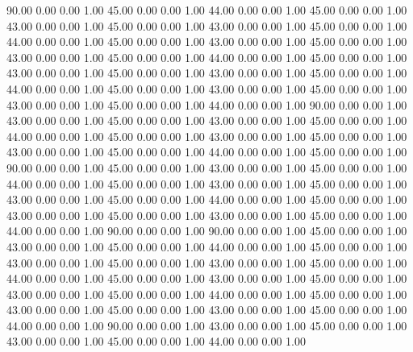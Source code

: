    90.00   0.00   0.00   1.00
   45.00   0.00   0.00   1.00
   44.00   0.00   0.00   1.00
   45.00   0.00   0.00   1.00
   43.00   0.00   0.00   1.00
   45.00   0.00   0.00   1.00
   43.00   0.00   0.00   1.00
   45.00   0.00   0.00   1.00
   44.00   0.00   0.00   1.00
   45.00   0.00   0.00   1.00
   43.00   0.00   0.00   1.00
   45.00   0.00   0.00   1.00
   43.00   0.00   0.00   1.00
   45.00   0.00   0.00   1.00
   44.00   0.00   0.00   1.00
   45.00   0.00   0.00   1.00
   43.00   0.00   0.00   1.00
   45.00   0.00   0.00   1.00
   43.00   0.00   0.00   1.00
   45.00   0.00   0.00   1.00
   44.00   0.00   0.00   1.00
   45.00   0.00   0.00   1.00
   43.00   0.00   0.00   1.00
   45.00   0.00   0.00   1.00
   43.00   0.00   0.00   1.00
   45.00   0.00   0.00   1.00
   44.00   0.00   0.00   1.00
   90.00   0.00   0.00   1.00
   43.00   0.00   0.00   1.00
   45.00   0.00   0.00   1.00
   43.00   0.00   0.00   1.00
   45.00   0.00   0.00   1.00
   44.00   0.00   0.00   1.00
   45.00   0.00   0.00   1.00
   43.00   0.00   0.00   1.00
   45.00   0.00   0.00   1.00
   43.00   0.00   0.00   1.00
   45.00   0.00   0.00   1.00
   44.00   0.00   0.00   1.00
   45.00   0.00   0.00   1.00
   90.00   0.00   0.00   1.00
   45.00   0.00   0.00   1.00
   43.00   0.00   0.00   1.00
   45.00   0.00   0.00   1.00
   44.00   0.00   0.00   1.00
   45.00   0.00   0.00   1.00
   43.00   0.00   0.00   1.00
   45.00   0.00   0.00   1.00
   43.00   0.00   0.00   1.00
   45.00   0.00   0.00   1.00
   44.00   0.00   0.00   1.00
   45.00   0.00   0.00   1.00
   43.00   0.00   0.00   1.00
   45.00   0.00   0.00   1.00
   43.00   0.00   0.00   1.00
   45.00   0.00   0.00   1.00
   44.00   0.00   0.00   1.00
   90.00   0.00   0.00   1.00
   90.00   0.00   0.00   1.00
   45.00   0.00   0.00   1.00
   43.00   0.00   0.00   1.00
   45.00   0.00   0.00   1.00
   44.00   0.00   0.00   1.00
   45.00   0.00   0.00   1.00
   43.00   0.00   0.00   1.00
   45.00   0.00   0.00   1.00
   43.00   0.00   0.00   1.00
   45.00   0.00   0.00   1.00
   44.00   0.00   0.00   1.00
   45.00   0.00   0.00   1.00
   43.00   0.00   0.00   1.00
   45.00   0.00   0.00   1.00
   43.00   0.00   0.00   1.00
   45.00   0.00   0.00   1.00
   44.00   0.00   0.00   1.00
   45.00   0.00   0.00   1.00
   43.00   0.00   0.00   1.00
   45.00   0.00   0.00   1.00
   43.00   0.00   0.00   1.00
   45.00   0.00   0.00   1.00
   44.00   0.00   0.00   1.00
   90.00   0.00   0.00   1.00
   43.00   0.00   0.00   1.00
   45.00   0.00   0.00   1.00
   43.00   0.00   0.00   1.00
   45.00   0.00   0.00   1.00
   44.00   0.00   0.00   1.00
